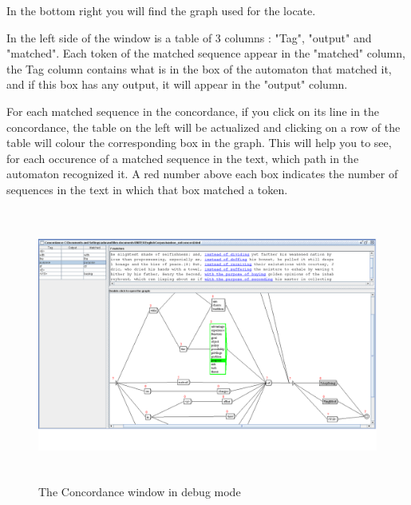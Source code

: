 \medskip
\indent In the bottom right you will find the graph used for the locate.

\medskip
\indent In the left side of the window is a table of 3 columns : "Tag", "output" and "matched".
Each token of the matched sequence appear in the "matched" column, the Tag column contains what is in the box of the automaton that matched it, and if this box has any output, it will appear in the "output" column.

\bigskip
\noindent For each matched sequence in the concordance, if you click on its line in the concordance, the table on the left will be actualized and clicking on a row of the table will colour the corresponding box in the graph.
\bigskip
\noindent This will help you to see, for each occurence of a matched sequence in the text, which path in the automaton recognized it. A red number above each box indicates the number of sequences in the text in which that box matched a token. 


\begin{figure}[h]
\begin{center}
\includegraphics[height=9cm]{resources/img/fig6-34.png}
\caption{The Concordance window in debug mode\label{fig-debug-mode}}
\end{center}
\end{figure}
